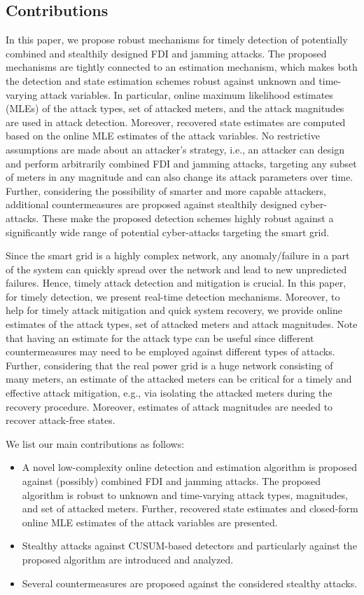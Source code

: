 \documentclass[onecolumn]{IEEEtran}
\begin{document}
\subsection{Contributions}

In this paper, we propose robust mechanisms for timely detection of potentially combined and stealthily designed FDI and jamming attacks. The proposed mechanisms are tightly connected to an estimation mechanism, which makes both the detection and state estimation schemes robust against unknown and time-varying attack variables. In particular, online maximum likelihood estimates (MLEs) of the attack types, set of attacked meters, and the attack magnitudes are used in attack detection. Moreover, recovered state estimates are computed based on the online MLE estimates of the attack variables. No restrictive assumptions are made about an attacker's strategy, i.e., an attacker can design and perform arbitrarily combined FDI and jamming attacks, targeting any subset of meters in any magnitude and can also change its attack parameters over time. Further, considering the possibility of smarter and more capable attackers, additional countermeasures are proposed against stealthily designed cyber-attacks. These make the proposed detection schemes highly robust against a  significantly wide range of potential cyber-attacks targeting the smart grid.

Since the smart grid is a highly complex network, any anomaly/failure in a part of the system can quickly spread over the network and lead to new unpredicted failures. Hence, timely attack detection and mitigation is crucial. In this paper, for timely detection, we present real-time detection mechanisms. Moreover, to help for timely attack mitigation and quick system recovery, we provide online estimates of the attack types, set of attacked meters and attack magnitudes. Note that having an estimate for the attack type can be useful since different countermeasures may need to be employed against different types of attacks. Further, considering that the real power grid is a huge network consisting of many meters, an estimate of the attacked meters can be critical for a timely and effective attack mitigation, e.g., via isolating the attacked meters during the recovery procedure. Moreover, estimates of attack magnitudes are needed to recover attack-free states.

We list our main contributions as follows:

\begin{itemize}
\item A novel low-complexity online detection and estimation algorithm is proposed against (possibly) combined FDI and jamming attacks. The proposed algorithm is robust to unknown and time-varying attack types, magnitudes, and set of attacked meters. Further, recovered state estimates and closed-form online MLE estimates of the attack variables are presented.
\item Stealthy attacks against CUSUM-based detectors and particularly against the proposed algorithm are introduced and analyzed.
\item Several countermeasures are proposed against the considered stealthy attacks.
\end{itemize}
\end{document}
